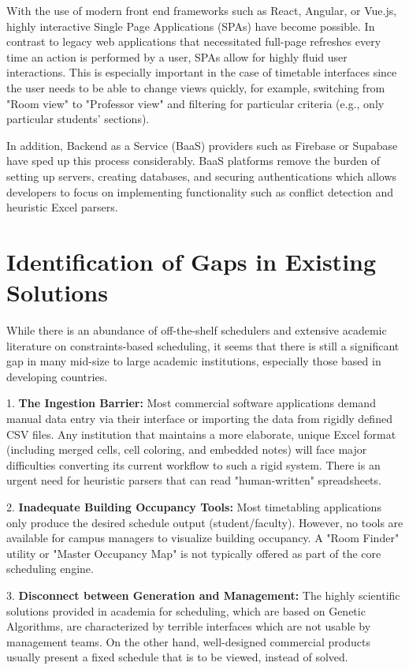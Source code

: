 With the use of modern front end frameworks such as React, Angular, or Vue.js, highly interactive Single Page Applications (SPAs) have become possible. In contrast to legacy web applications that necessitated full-page refreshes every time an action is performed by a user, SPAs allow for highly fluid user interactions. This is especially important in the case of timetable interfaces since the user needs to be able to change views quickly, for example, switching from "Room view" to "Professor view" and filtering for particular criteria (e.g., only particular students' sections).

In addition, Backend as a Service (BaaS) providers such as Firebase or Supabase have sped up this process considerably. BaaS platforms remove the burden of setting up servers, creating databases, and securing authentications which allows developers to focus on implementing functionality such as conflict detection and heuristic Excel parsers.

\section{Identification of Gaps in Existing Solutions}

While there is an abundance of off-the-shelf schedulers and extensive academic literature on constraints-based scheduling, it seems that there is still a significant gap in many mid-size to large academic institutions, especially those based in developing countries.

1. \textbf{The Ingestion Barrier:} Most commercial software applications demand manual data entry via their interface or importing the data from rigidly defined CSV files. Any institution that maintains a more elaborate, unique Excel format (including merged cells, cell coloring, and embedded notes) will face major difficulties converting its current workflow to such a rigid system. There is an urgent need for heuristic parsers that can read "human-written" spreadsheets.

2. \textbf{Inadequate Building Occupancy Tools:} Most timetabling applications only produce the desired schedule output (student/faculty). However, no tools are available for campus managers to visualize building occupancy. A "Room Finder" utility or "Master Occupancy Map" is not typically offered as part of the core scheduling engine.

3. \textbf{Disconnect between Generation and Management:} The highly scientific solutions provided in academia for scheduling, which are based on Genetic Algorithms, are characterized by terrible interfaces which are not usable by management teams. On the other hand, well-designed commercial products usually present a fixed schedule that is to be viewed, instead of solved.

